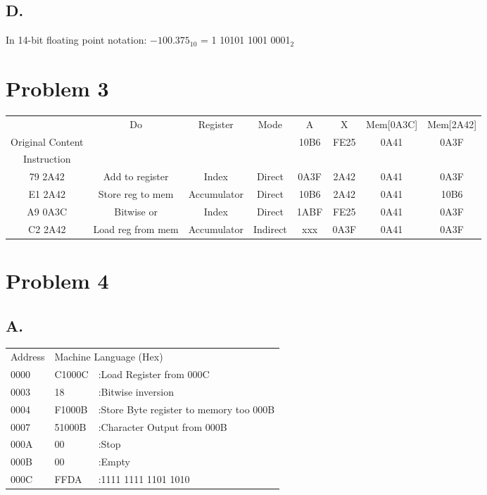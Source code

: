 \documentclass[a4paper,man,natbib]{apa6}
\begin{document}
\subsection{D.}
In 14-bit floating point notation:
$-100.375_{10}$ = 1 10101 1001 0001$_{2}$
\section{Problem 3}
\begin{center}
	\begin{adjustbox}{width=\textwidth}
		\begin{tabular}{|c|c|c|c|c|c|c|c|}
			
\cline{1-8}    & Do & Register & Mode     & A    & X    & Mem[0A3C] & Mem[2A42] \\ \cline{1-8}
Original Content &    &          &          & 10B6 & FE25 & 0A41      & 0A3F \\	\cline{1-1}
Instruction  &&&&&&& \\	\cline{1-8}
79 2A42  & Add to register & Index & Direct & 0A3F & 2A42 & 0A41 & 0A3F \\	
E1 2A42  & Store reg to mem&Accumulator&Direct&10B6 &2A42 & 0A41 & 10B6 \\	
A9 0A3C  & Bitwise or      & Index & Direct & 1ABF & FE25 & 0A41 & 0A3F \\	
C2 2A42  &Load reg from mem&Accumulator&Indirect&xxx &0A3F& 0A41 & 0A3F \\
\cline{1-8}	

		\end{tabular}
	\end{adjustbox}
\end{center}
\section{Problem 4}
\subsection{A.}
\begin{tabular}{l l l}
	Address & \multicolumn{2}{l}{Machine Language (Hex)} \\ \cline{1-3}
	0000 & C1000C & :Load Register from 000C \\
	0003 & 18 & :Bitwise inversion \\
	0004 & F1000B & :Store Byte register to memory too 000B \\
	0007 & 51000B & :Character Output from 000B\\
	000A & 00 & :Stop \\ 
	000B & 00 & :Empty \\
	000C & FFDA & :1111 1111 1101 1010 \\
\end{tabular}
\end{document}
